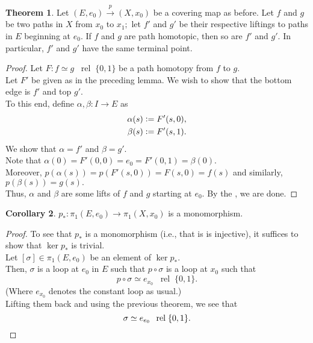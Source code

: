 \documentclass[12pt]{article}
\theoremstyle{definition}
\newtheorem{thm}{Theorem}
\numberwithin{thm}{section}
\newtheorem{cor}[thm]{Corollary}
\newcommand{\rel}{\;\;\operatorname{rel}\;}
\begin{document}
\begin{thm}
	Let $(E, e_0) \overset{p}{\longrightarrow} (X, x_0)$ be a covering map as before. Let $f$ and $g$ be two paths in $X$ from $x_0$ to $x_1;$ let $f'$ and $g'$ be their respective liftings to paths in $E$ beginning at $e_0.$ If $f$ and $g$ are path homotopic, then so are $f'$ and $g'.$ In particular, $f'$ and $g'$ have the same terminal point.
\end{thm}
\begin{proof} 
	Let $F:f\simeq g \rel \{0, 1\}$ be a path homotopy from $f$ to $g.$\\
	Let $F'$ be given as in the preceding lemma. We wish to show that the bottom edge is $f'$ and top $g'.$\\
	To this end, define $\alpha, \beta:I\to E$ as
	\begin{align*} 
		\alpha(s) &\vcentcolon= F'(s, 0),\\
		\beta(s) &\vcentcolon= F'(s, 1).
	\end{align*}
	We show that $\alpha = f'$ and $\beta = g'.$\\
	Note that $\alpha(0) = F'(0, 0) = e_0 = F'(0, 1) = \beta(0).$\\
	Moreover, $p(\alpha(s)) = p(F'(s, 0)) = F(s, 0) = f(s)$ and similarly, $p(\beta(s)) = g(s).$\\
	Thus, $\alpha$ and $\beta$ are some lifts of $f$ and $g$ starting at $e_0.$ By the , we are done.
\end{proof}
\begin{cor}
	$p_* : \pi_1(E, e_0) \to \pi_1(X, x_0)$ is a monomorphism.
\end{cor}
\begin{proof} 
	To see that $p_*$ is a monomorphism (i.e., that is is injective), it suffices to show that $\ker p_*$ is trivial.\\
	Let $[\sigma] \in \pi_1(E, e_0)$ be an element of $\ker p_*.$\\
	Then, $\sigma$ is a loop at $e_0$ in $E$ such that $p \circ \sigma$ is a loop at $x_0$ such that
	\begin{equation*} 
		p\circ \sigma \simeq e_{x_0} \rel \{0, 1\}.
	\end{equation*}
	(Where $e_{x_0}$ denotes the constant loop as usual.)\\
	Lifting them back and using the previous theorem, we see that
	\begin{equation*} 
		\sigma \simeq e_{e_0} \rel \{0, 1\}. \qedhere
	\end{equation*}
\end{proof}
\end{document}
